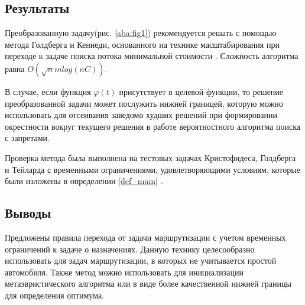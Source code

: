 \documentclass[]{TAACpaper}
\begin{document}
\subsection{Результаты}
Преобразованную задачу(рис. \ref{aba:fig1}) рекомендуется решать с помощью метода Голдберга и Кеннеди,  основанного на технике масштабирования при переходе к задаче поиска потока минимальной стоимости \cite{Goldberg_Kennedy}. Сложность алгоритма равна $O(\sqrt{n}mlog(nC))$.

В случае, если функция $\varphi(t)$ присутствует в целевой функции, то решение преобразованной задачи может послужить нижней границей, которую можно использовать для отсеивания заведомо худших решений при формировании окрестности вокруг текущего решения в работе вероятностного алгоритма поиска с запретами.

Проверка метода была выполнена на тестовых задачах Кристофидеса, Голдберга  и Тейларда с временными ограничениями, удовлетворяющими условиям, которые были изложены в определении \ref{def_main} \cite{problems_Christofides,problems_Golden,problems_Taillard}.    

\subsection{Выводы}
Предложены правила перехода от задачи маршрутизации с учетом временных ограничений к задаче о назначениях. Данную технику целесообразно использовать для задач маршрутизации, в которых не учитывается простой автомобиля. Также  метод можно использовать для инициализации метаэвристического алгоритма или в виде более качественной нижней границы для определения оптимума. 
\end{document}
